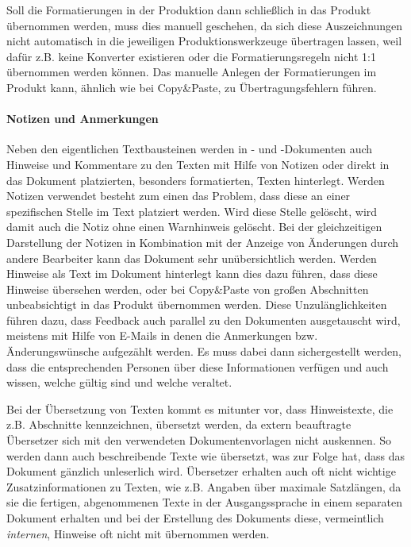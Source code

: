 Soll die Formatierungen in der Produktion dann schließlich in das Produkt übernommen werden, muss dies manuell geschehen, da sich diese Auszeichnungen nicht automatisch in die jeweiligen Produktionswerkzeuge übertragen lassen, weil dafür z.B. keine Konverter existieren oder die Formatierungsregeln nicht 1:1 übernommen werden können. Das manuelle Anlegen der Formatierungen im Produkt kann, ähnlich wie bei Copy\&Paste, zu Übertragungsfehlern führen.

\paragraph{Notizen und Anmerkungen} Neben den eigentlichen Textbausteinen werden in - und -Dokumenten auch Hinweise und Kommentare zu den Texten mit Hilfe von Notizen oder direkt in das Dokument platzierten, besonders formatierten, Texten hinterlegt. Werden Notizen verwendet besteht zum einen das Problem, dass diese an einer spezifischen Stelle im Text platziert werden. Wird diese Stelle gelöscht, wird damit auch die Notiz ohne einen Warnhinweis gelöscht. Bei der gleichzeitigen Darstellung der Notizen in Kombination mit der Anzeige von Änderungen durch andere Bearbeiter kann das Dokument sehr unübersichtlich werden. Werden Hinweise als Text im Dokument hinterlegt kann dies dazu führen, dass diese Hinweise übersehen werden, oder bei Copy\&Paste von großen Abschnitten unbeabsichtigt in das Produkt übernommen  werden. Diese Unzulänglichkeiten führen dazu, dass Feedback auch parallel zu den Dokumenten ausgetauscht wird, meistens mit Hilfe von E-Mails in denen die Anmerkungen bzw. Änderungswünsche aufgezählt werden. Es muss dabei dann sichergestellt werden, dass die entsprechenden Personen über diese Informationen verfügen und auch wissen, welche gültig sind und welche veraltet.

Bei der Übersetzung von Texten kommt es mitunter vor, dass Hinweistexte, die z.B. Abschnitte kennzeichnen, übersetzt werden, da extern beauftragte Übersetzer sich mit den verwendeten Dokumentenvorlagen nicht auskennen. So werden dann auch beschreibende Texte wie  übersetzt, was zur Folge hat, dass das Dokument gänzlich unleserlich wird. Übersetzer erhalten auch oft nicht wichtige Zusatzinformationen zu Texten, wie z.B. Angaben über maximale Satzlängen, da sie die fertigen, abgenommenen Texte in der Ausgangssprache in einem separaten Dokument erhalten und bei der Erstellung des Dokuments diese, vermeintlich \emph{internen}, Hinweise oft nicht mit übernommen werden.

